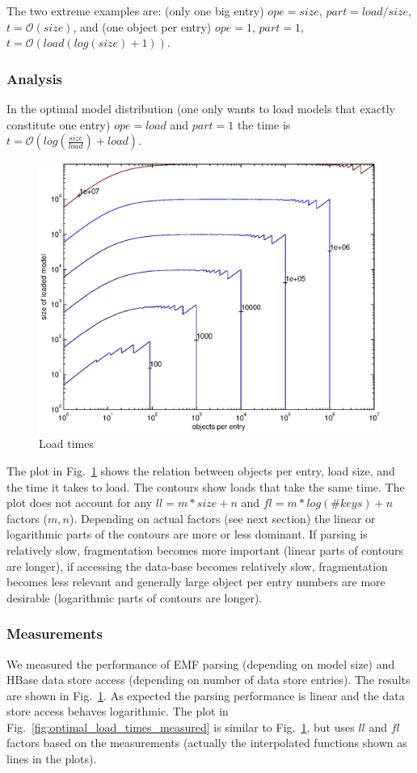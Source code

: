 The two extreme examples are: (only one big entry) $ope=size$, $part=load/size$, $t=\mathcal{O}\left(size\right)$, and (one object per entry) $ope=1$, $part=1$, $t=\mathcal{O}\left(load\left(log(size)+1\right)\right)$. 

\subsubsection{Analysis}
In the optimal model distribution (one only wants to load models that exactly constitute one entry) $ope=load$ and $part=1$ the time is $t=\mathcal{O}\left(log(\frac{size}{load})+load\right)$.

\begin{figure}
  \centering
  \includegraphics[width=0.65\linewidth]{figures/optimal_load_times}
  \caption{Load times}
  \label{fig:optimal_load_times}
\end{figure}

The plot in Fig.~\ref{fig:optimal_load_times} shows the relation between objects per entry, load size, and the time it takes to load. The contours show loads that take the same time. The plot does not account for any $ll=m*size+n$ and $fl=m*log(\#keys)+n$ factors ($m,n$). Depending on actual factors (see next section) the linear or logarithmic parts of the contours are more or less dominant. If parsing is relatively slow, fragmentation becomes more important (linear parts of contours are longer), if accessing the data-base becomes relatively slow, fragmentation becomes less relevant and generally large object per entry numbers are more desirable (logarithmic parts of contours are longer).

\subsubsection{Measurements}

We measured the performance of EMF parsing (depending on model size) and HBase data store access (depending on number of data store entries). The results are shown in Fig.~\ref{fig:optimal_load_times}. As expected the parsing performance is linear and the data store access behaves logarithmic. The plot in Fig.~\ref{fig:optimal_load_times_measured} is similar to Fig.~\ref{fig:optimal_load_times}, but uses $ll$ and $fl$ factors based on the measurements (actually the interpolated functions shown as lines in the plots).  

